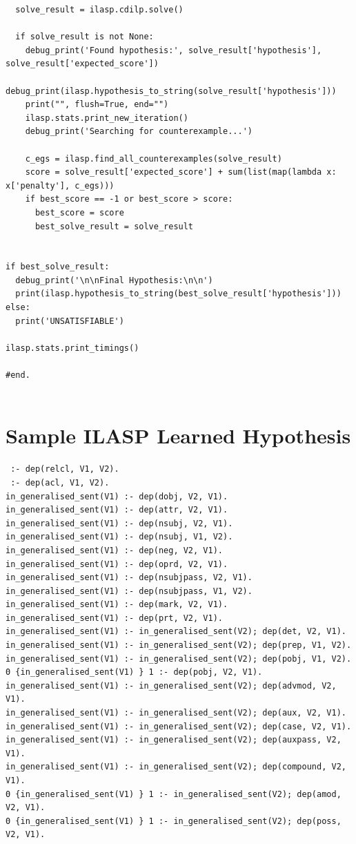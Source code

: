 \begin{lstlisting}
  solve_result = ilasp.cdilp.solve()

  if solve_result is not None:
    debug_print('Found hypothesis:', solve_result['hypothesis'], solve_result['expected_score'])
    debug_print(ilasp.hypothesis_to_string(solve_result['hypothesis']))
    print("", flush=True, end="")
    ilasp.stats.print_new_iteration()
    debug_print('Searching for counterexample...')

    c_egs = ilasp.find_all_counterexamples(solve_result)
    score = solve_result['expected_score'] + sum(list(map(lambda x: x['penalty'], c_egs)))
    if best_score == -1 or best_score > score:
      best_score = score
      best_solve_result = solve_result


if best_solve_result:
  debug_print('\n\nFinal Hypothesis:\n\n')
  print(ilasp.hypothesis_to_string(best_solve_result['hypothesis']))
else:
  print('UNSATISFIABLE')

ilasp.stats.print_timings()

#end.


\end{lstlisting}


\chapter{Sample ILASP Learned Hypothesis}
\label{learned-solution-example-appendix}

\begin{lstlisting}
 :- dep(relcl, V1, V2).
 :- dep(acl, V1, V2).
in_generalised_sent(V1) :- dep(dobj, V2, V1).
in_generalised_sent(V1) :- dep(attr, V2, V1).
in_generalised_sent(V1) :- dep(nsubj, V2, V1).
in_generalised_sent(V1) :- dep(nsubj, V1, V2).
in_generalised_sent(V1) :- dep(neg, V2, V1).
in_generalised_sent(V1) :- dep(oprd, V2, V1).
in_generalised_sent(V1) :- dep(nsubjpass, V2, V1).
in_generalised_sent(V1) :- dep(nsubjpass, V1, V2).
in_generalised_sent(V1) :- dep(mark, V2, V1).
in_generalised_sent(V1) :- dep(prt, V2, V1).
in_generalised_sent(V1) :- in_generalised_sent(V2); dep(det, V2, V1).
in_generalised_sent(V1) :- in_generalised_sent(V2); dep(prep, V1, V2).
in_generalised_sent(V1) :- in_generalised_sent(V2); dep(pobj, V1, V2).
0 {in_generalised_sent(V1) } 1 :- dep(pobj, V2, V1).
in_generalised_sent(V1) :- in_generalised_sent(V2); dep(advmod, V2, V1).
in_generalised_sent(V1) :- in_generalised_sent(V2); dep(aux, V2, V1).
in_generalised_sent(V1) :- in_generalised_sent(V2); dep(case, V2, V1).
in_generalised_sent(V1) :- in_generalised_sent(V2); dep(auxpass, V2, V1).
in_generalised_sent(V1) :- in_generalised_sent(V2); dep(compound, V2, V1).
0 {in_generalised_sent(V1) } 1 :- in_generalised_sent(V2); dep(amod, V2, V1).
0 {in_generalised_sent(V1) } 1 :- in_generalised_sent(V2); dep(poss, V2, V1).
\end{lstlisting}

